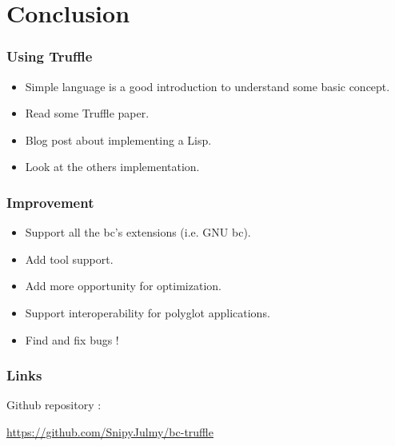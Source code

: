 \documentclass[11pt,handout]{beamer}
\begin{document}
\section[Conclusion]{Conclusion}

\begin{frame}[fragile]
  \frametitle{Using Truffle}
  \begin{itemize}
  \item Simple language is a good introduction to understand some basic concept.
  \item Read some Truffle paper.
  \item Blog post about implementing a Lisp.
  \item Look at the others implementation.
  \end{itemize}
\end{frame}

\begin{frame}[fragile]
  \frametitle{Improvement}
  \begin{itemize}
  \item Support all the bc's extensions (i.e. GNU bc).
  \item Add tool support.
  \item Add more opportunity for optimization.
  \item Support interoperability for polyglot applications.
  \item Find and fix bugs !
  \end{itemize}
\end{frame}

\begin{frame}[fragile]
  \frametitle{Links}
  Github repository :

  \url{https://github.com/SnipyJulmy/bc-truffle}
\end{frame}

\end{document}
